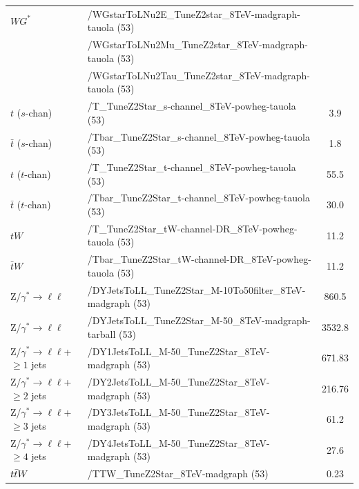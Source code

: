 \begin{table}[!ht]
\begin{center}
{\begin{tabular}{l|l|c}
$WG^{*}$  & /WGstarToLNu2E\_TuneZ2star\_8TeV-madgraph-tauola (53)          &  \\
        & /WGstarToLNu2Mu\_TuneZ2star\_8TeV-madgraph-tauola (53)          &  \\
        & /WGstarToLNu2Tau\_TuneZ2star\_8TeV-madgraph-tauola (53)          &  \\
$t$ ($s$-chan)                           &   /T\_TuneZ2Star\_s-channel\_8TeV-powheg-tauola (53)                        &  3.9 \\
$\bar{t}$ ($s$-chan)                     &   /Tbar\_TuneZ2Star\_s-channel\_8TeV-powheg-tauola (53)                      &  1.8 \\
$t$ ($t$-chan)                           &   /T\_TuneZ2Star\_t-channel\_8TeV-powheg-tauola (53)                         &  55.5 \\
$\bar{t}$ ($t$-chan)                     &   /Tbar\_TuneZ2Star\_t-channel\_8TeV-powheg-tauola (53)                      &  30.0 \\
$tW$                                     &   /T\_TuneZ2Star\_tW-channel-DR\_8TeV-powheg-tauola (53)                     &  11.2 \\
$\bar{t} W$                               &   /Tbar\_TuneZ2Star\_tW-channel-DR\_8TeV-powheg-tauola (53)                  &  11.2 \\
Z/$\gamma^* \rightarrow \ell \ell$      & /DYJetsToLL\_TuneZ2Star\_M-10To50filter\_8TeV-madgraph (53)                   &  860.5 \\
Z/$\gamma^* \rightarrow \ell \ell$      & /DYJetsToLL\_TuneZ2Star\_M-50\_8TeV-madgraph-tarball (53)                   &  3532.8 \\
Z/$\gamma^* \rightarrow \ell \ell$+$\geq 1$ jets       & /DY1JetsToLL\_M-50\_TuneZ2Star\_8TeV-madgraph (53)                   &  671.83 \\
Z/$\gamma^* \rightarrow \ell \ell$+$\geq 2$ jets       & /DY2JetsToLL\_M-50\_TuneZ2Star\_8TeV-madgraph (53)                   &  216.76 \\
Z/$\gamma^* \rightarrow \ell \ell$+$\geq 3$ jets       & /DY3JetsToLL\_M-50\_TuneZ2Star\_8TeV-madgraph (53)                   &  61.2 \\
Z/$\gamma^* \rightarrow \ell \ell$+$\geq 4$ jets       & /DY4JetsToLL\_M-50\_TuneZ2Star\_8TeV-madgraph (53)                   &  27.6 \\
$t\bar{t} W$                                       &   /TTW\_TuneZ2Star\_8TeV-madgraph (53)                   &  0.23 \\

\end{tabular}}
\end{center}
\end{table}
